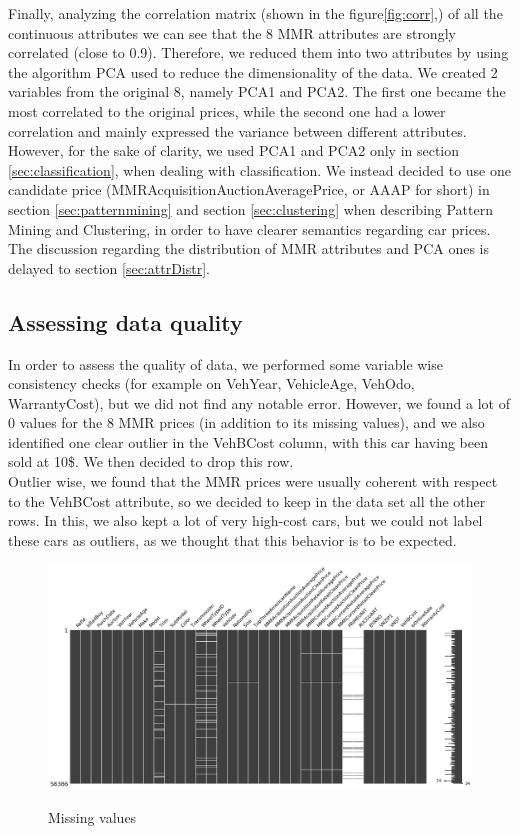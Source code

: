 \documentclass{article}
\begin{document}
	
	Finally, analyzing the correlation matrix (shown in the figure\ref {fig:corr},) of all the continuous attributes we can see that the 8 MMR attributes are strongly correlated (close to 0.9). Therefore, we reduced them into two attributes by using the algorithm PCA used to reduce the dimensionality of the data. We created 2 variables from the original 8, namely PCA1 and PCA2. The first one became the most correlated to the original prices, while the second one had a lower correlation and mainly expressed the variance between different attributes.\\
	However, for the sake of clarity, we used PCA1 and PCA2 only in section \ref{sec:classification}, when dealing with classification. We instead decided to use one candidate price (MMRAcquisitionAuctionAveragePrice, or AAAP for short) in section \ref{sec:patternmining} and section \ref{sec:clustering} when describing Pattern Mining and Clustering, in order to have clearer semantics regarding car prices. 
	The discussion regarding the distribution of MMR attributes and PCA ones is delayed to section \ref{sec:attrDistr}.
	
	
	\subsection{Assessing data quality}
	
	In order to assess the quality of data, we performed some variable wise consistency checks (for example on VehYear, VehicleAge, VehOdo, WarrantyCost), but we did not find any notable error. However, we found a lot of 0 values for the 8 MMR prices (in addition to its missing values), and we also identified one clear outlier in the VehBCost column, with this car having been sold at 10\$. We then decided to drop this row. \\
	Outlier wise, we found that the MMR prices were usually coherent with respect to the VehBCost attribute, so we decided to keep in the data set all the other rows. In this, we also kept a lot of very high-cost cars, but we could not label these cars as outliers, as we thought that this behavior is to be expected.
	
	\begin{figure}[H]
		\centering
		{\includegraphics[width=\textwidth, height=.8\textheight, keepaspectratio]{missingv.png}}
		\caption{{ Missing values }}
		\label{fig:missingval}
	\end{figure}
	
\end{document}
